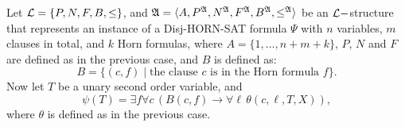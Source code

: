 Let ${\cal L} = \{P,N,F,B,\leq\}$, and ${\frak A} = \langle A, P^{\frak A}, N^{\frak A}, F^{\frak A}, B^{\frak A}, \leq^{\frak A} \rangle$ be an ${\cal L}-$structure that represents an instance of a {\sc Disj-HORN-SAT} formula $\Psi$ with $n$ variables, $m$ clauses in total, and $k$ Horn formulas, where $A = \{1,\ldots,n+m+k\}$, $P$, $N$ and $F$ are defined as in the previous case, and $B$ is defined as:
\[
	B = \{ (c,f) \mid 
		\mbox{the clause $c$ is in the Horn formula $f$}
	\}.
\]
Now let $T$ be a unary second order variable, and
\[
	\psi(T) = \exists f\forall c\,(B(c,f)\to \forall\ell\,\theta(c,\ell,T,X)),
\]
where $\theta$ is defined as in the previous case.